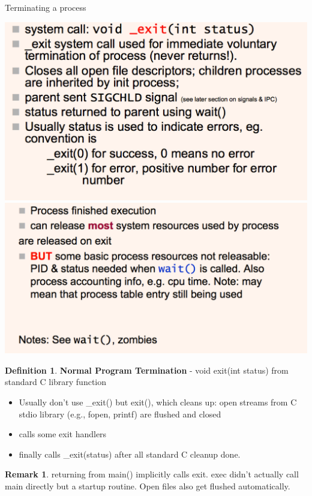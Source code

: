 \documentclass[12pt,a4paper]{article}
\theoremstyle{definition}
\newtheorem*{remark}{Remark}
\newtheorem{definition}{Definition}[section]
\newenvironment{myitemize}
{ \begin{itemize}
    \setlength{\itemsep}{5pt}
    \setlength{\parskip}{0pt}
    \setlength{\parsep}{0pt}     }
{ \end{itemize}                  }
\begin{document}
\begin{tcolorbox}
	\textsf{Terminating a process}
	
	\includegraphics[scale=0.33]{m1/terminatingProcess1}
	\includegraphics[scale=0.33]{m1/terminatingProcess2}
	\centering
\end{tcolorbox}

\begin{definition}{\textbf{Normal Program Termination} - \textsf{void exit(int status)} from standard C library function}
	\begin{myitemize}
		\item Usually don't use \textsf{\_exit()} but \textsf{exit()}, which cleans up: open streams from C stdio library (e.g., \textsf{fopen}, \textsf{printf}) are flushed and closed
		\item calls some \textsf{exit} handlers
		\item finally calls \textsf{\_exit(status)} after all standard C cleanup done.
	\end{myitemize}
\end{definition}
\begin{remark}
	returning from \textsf{main()} implicitly calls \textsf{exit}. \textsf{exec} didn't actually call main directly but a startup routine. Open files also get flushed automatically.
\end{remark}
\end{document}
